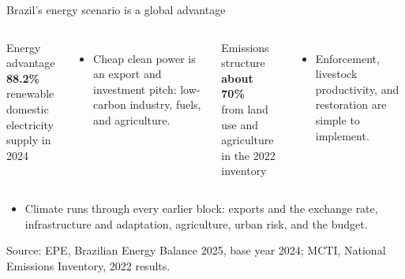 \documentclass[10pt,aspectratio=169]{beamer}
\newcommand{\source}[1]{%
  \par\vfill{\tiny\color{MidGray}Source: #1}}
\begin{document}
\begin{frame}{Brazil's energy scenario is a global advantage}
  \begin{columns}[T,onlytextwidth]
      \begin{exampleblock}{Energy advantage}
        \centering
        {\fontsize{30}{34}\selectfont\color{BrazilGreen}\textbf{88.2\%}}\\
        renewable domestic electricity supply in 2024
      \end{exampleblock}
      \begin{itemize}
        \item Cheap clean power is an export and investment pitch: low-carbon industry, fuels, and agriculture.
      \end{itemize}
      \begin{block}{Emissions structure}
        \centering
        {\fontsize{26}{30}\selectfont\color{Brick}\textbf{about 70\%}}\\
        from land use and agriculture in the 2022 inventory
      \end{block}
      \begin{itemize}
        \item Enforcement, livestock productivity, and restoration are simple to implement.
      \end{itemize}
  \end{columns}
  \vspace{.3cm}
  \begin{itemize}
    \item Climate runs through every earlier block: exports and the exchange rate, infrastructure and adaptation, agriculture, urban risk, and the budget.
  \end{itemize}
  \source{EPE, Brazilian Energy Balance 2025, base year 2024; MCTI, National Emissions Inventory, 2022 results.}
\end{frame}
\end{document}
